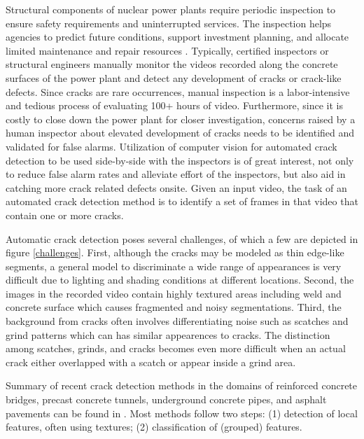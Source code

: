     Structural components of nuclear power plants require periodic inspection to ensure safety requirements and uninterrupted services. The inspection helps agencies to predict future conditions, support investment planning, and allocate limited maintenance and repair resources \cite{Koch:2015}. Typically, certified inspectors or structural engineers manually monitor the videos recorded along the concrete surfaces of the power plant and detect any development of cracks or crack-like defects. Since cracks are rare occurrences, manual inspection is a labor-intensive and tedious process of evaluating 100+ hours of video. Furthermore, since it is costly to close down the power plant for closer investigation, concerns raised by a human inspector about elevated development of cracks needs to be identified and validated for false alarms. Utilization of computer vision for automated crack detection to be used side-by-side with the inspectors is of great interest, not only to reduce false alarm rates and alleviate effort of the inspectors, but also aid in catching more crack related defects onsite.  Given an input video, the task of an automated crack detection method is to identify a set of frames in that video that contain one or more cracks.
    

  Automatic crack detection poses several challenges, of which a few are depicted in figure \ref{challenges}. First, although the cracks may be modeled as thin edge-like segments, a general model to discriminate a wide range of appearances is very difficult due to lighting and shading conditions at different locations. Second, the images in the recorded video contain highly textured areas including weld and concrete surface which causes fragmented and noisy segmentations. Third, the background from cracks often involves differentiating noise such as scatches and grind patterns which can has similar appearences to cracks. The distinction among scatches, grinds, and cracks becomes even more difficult when an actual crack either overlapped with a scatch or appear inside a grind area.
    

    Summary of recent crack detection methods in the domains of reinforced concrete bridges, precast concrete tunnels, underground concrete pipes, and asphalt pavements can be found in \cite{Koch:2015}.  Most methods follow two steps:
    (1) detection of local features, often using textures; 
    (2) classification of (grouped) features.
    
